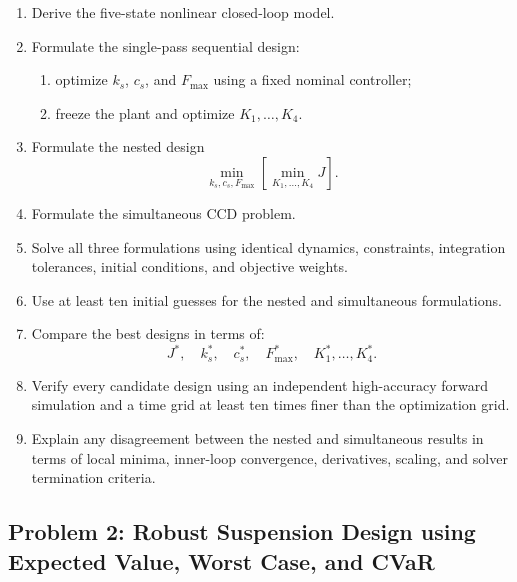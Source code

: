 \begin{enumerate}
    \item Derive the five-state nonlinear closed-loop model.

    \item Formulate the single-pass sequential design:
    \begin{enumerate}
        \item optimize $k_s$, $c_s$, and $F_{\max}$ using a fixed nominal
        controller;
        \item freeze the plant and optimize $K_1,\ldots,K_4$.
    \end{enumerate}

    \item Formulate the nested design
    \begin{equation}
    \min_{k_s,c_s,F_{\max}}
    \left[
    \min_{K_1,\ldots,K_4}
    J
    \right].
    \end{equation}

    \item Formulate the simultaneous CCD problem.

    \item Solve all three formulations using identical dynamics, constraints,
    integration tolerances, initial conditions, and objective weights.

    \item Use at least ten initial guesses for the nested and simultaneous
    formulations.

    \item Compare the best designs in terms of:
    \begin{equation}
    J^*,
    \quad
    k_s^*,
    \quad
    c_s^*,
    \quad
    F_{\max}^*,
    \quad
    K_1^*,\ldots,K_4^*.
    \end{equation}

    \item Verify every candidate design using an independent high-accuracy
    forward simulation and a time grid at least ten times finer than the
    optimization grid.

    \item Explain any disagreement between the nested and simultaneous
    results in terms of local minima, inner-loop convergence, derivatives,
    scaling, and solver termination criteria.
\end{enumerate}


\subsection*{Problem 2: Robust Suspension Design using Expected Value, Worst Case, and CVaR}

